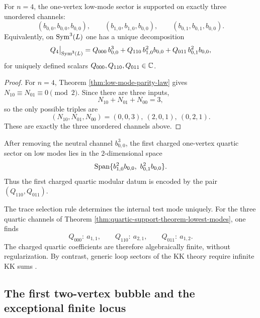 \begin{theorem}
\label{thm:quartic-support-theorem-lowest-modes}
For $n=4$, the one-vertex low-mode sector is supported on exactly three unordered channels:
\[
(b_{0,0},b_{0,0},b_{0,0}),
\qquad
(b_{1,0},b_{1,0},b_{0,0}),
\qquad
(b_{0,1},b_{0,1},b_{0,0}).
\]
Equivalently, on $\operatorname{Sym}^3(L)$ one has a unique decomposition
\begin{equation}
\label{eq:q4-normal-form}
Q_4\big|_{\operatorname{Sym}^3(L)}
=
Q_{000}\,b_{0,0}^3
+
Q_{110}\,b_{1,0}^2b_{0,0}
+
Q_{011}\,b_{0,1}^2b_{0,0},
\end{equation}
for uniquely defined scalars $Q_{000},Q_{110},Q_{011}\in\mathbb C$.
\end{theorem}

\begin{proof}
For $n=4$, Theorem \ref{thm:low-mode-parity-law} gives
$N_{10}\equiv N_{01}\equiv 0\pmod 2$. Since there are three inputs,
\[
N_{10}+N_{01}+N_{00}=3,
\]
so the only possible triples are
\[
(N_{10},N_{01},N_{00})=(0,0,3),\ (2,0,1),\ (0,2,1).
\]
These are exactly the three unordered channels above.
\end{proof}

\begin{corollary}
\label{cor:charged-quartic-sector-two-dimensional}
After removing the neutral channel $b_{0,0}^3$, the first charged one-vertex quartic sector on
low modes lies in the $2$-dimensional space
\[
\Span\{b_{1,0}^2b_{0,0},\ b_{0,1}^2b_{0,0}\}.
\]
Thus the first charged quartic modular datum is encoded by the pair $(Q_{110},Q_{011})$.
\end{corollary}

\begin{remark}
\label{rem:tiny-internal-support}
The trace selection rule determines the internal test mode uniquely. For the three quartic
channels of Theorem \ref{thm:quartic-support-theorem-lowest-modes}, one finds
\[
Q_{000}: \ a_{1,1},
\qquad
Q_{110}: \ a_{2,1},
\qquad
Q_{011}: \ a_{1,2}.
\]
The charged quartic coefficients are therefore algebraically finite, without regularization. By contrast, generic loop sectors of the KK theory require infinite KK sums \cite{ZengTwistedHolography}.
\end{remark}

\subsection{The first two-vertex bubble and the exceptional finite locus}
\label{subsec:first-two-vertex-bubble-exceptional-finite-locus}

